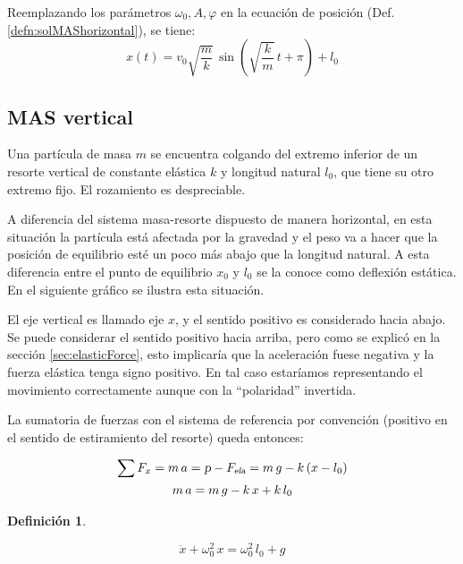 \documentclass[a5paper,12pt,twoside]{book}
\newtheorem{defn}{{Definición}}[chapter]
\begin{document}
\begin{mdframed}[style=MyFrame2]
    Reemplazando los parámetros $\omega_0, A, \varphi$ en la ecuación de posición (Def. \ref{defn:solMAShorizontal}), se tiene:
    \[
      x(t) = v_0 \sqrt{\frac{m}{k}} \, \sin{\left( \sqrt{\frac{k}{m}} \, t + \pi \right)} + l_0
    \]
\end{mdframed}


\subsection{MAS vertical}

Una partícula de masa $m$ se encuentra colgando del extremo inferior de un resorte vertical de constante elástica $k$ y longitud natural $l_0$, que tiene su otro extremo fijo. El rozamiento es despreciable.

A diferencia del sistema masa-resorte dispuesto de manera horizontal, en esta situación la partícula está afectada por la gravedad y el peso va a hacer que la posición de equilibrio esté un poco más abajo que la longitud natural. A esta diferencia entre el punto de equilibrio $x_0$ y $l_0$ se la conoce como deflexión estática. En el siguiente gráfico se ilustra esta situación.

\begin{center}
    \vspace{-2cm}
    \def\svgwidth{0.7\linewidth}
    
    \vspace{-2cm}
\end{center}

El eje vertical es llamado eje $x$, y el sentido positivo es considerado hacia abajo. Se puede considerar el sentido positivo hacia arriba, pero como se explicó en la sección \ref{sec:elasticForce}, esto implicaría que la aceleración fuese negativa y la fuerza elástica tenga signo positivo. En tal caso estaríamos representando el movimiento correctamente aunque con la ``polaridad'' invertida.

La sumatoria de fuerzas con el sistema de referencia por convención (positivo en el sentido de estiramiento del resorte) queda entonces:

\begin{gather*}
    \sum F_x = m \, a = \textsl{p} - {{F}_\textsl{{ela}}}  = m \, g - k \left(x-l_0\right)
    \\
    m \, a = m \, g - k \, x + k \, l_0
\end{gather*}

\begin{mdframed}[style=MyFrame1]
    \begin{defn}
        \label{defn:}
    \end{defn}
    \begin{equation*}
        \ddot{x} + \omega_0^2 \, x = \omega_0^2 \, l_0 + g
    \end{equation*}
\end{mdframed}
\end{document}
